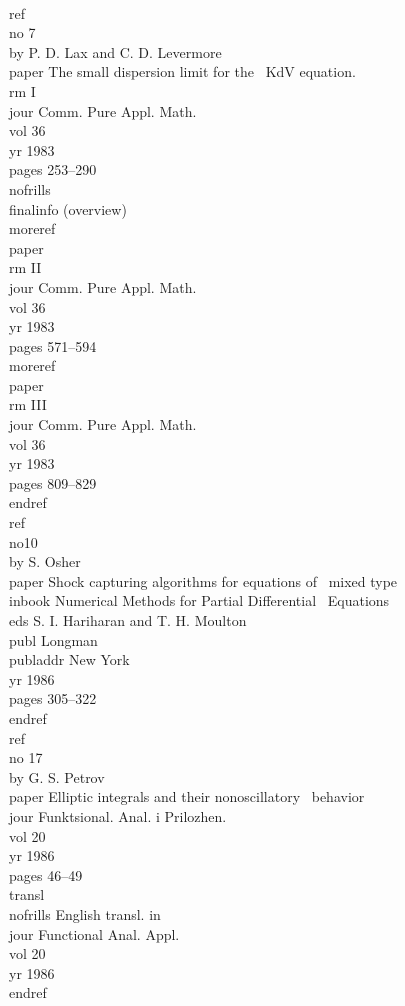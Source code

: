 \beginexample{\exindent=0pt}
\\ref\\no 7
\\by P. D. Lax and C. D. Levermore
\\paper The small dispersion limit for the
\ KdV equation.~{\\rm I}
\\jour Comm. Pure Appl. Math. \\vol 36 \\yr 1983
\\pages 253--290 \\nofrills\\finalinfo (overview)
\\moreref\\paper {\\rm II}
\\jour Comm. Pure Appl. Math. 
\\vol 36 \\yr 1983 \\pages 571--594
\\moreref\\paper {\\rm III}
\\jour Comm. Pure Appl. Math. 
\\vol 36 \\yr 1983 \\pages 809--829 \\endref
\ {}
\\ref\\no10 \\by S. Osher
\\paper Shock capturing algorithms for equations of
\ mixed type
\\inbook Numerical Methods for Partial Differential
\ Equations \\eds S. I. Hariharan and T. H. Moulton
\\publ Longman \\publaddr New York \\yr 1986
\\pages 305--322
\\endref
\ {}
\\ref\\no 17 \\by G. S. Petrov
\\paper Elliptic integrals and their nonoscillatory
\ behavior
\\jour Funktsional. Anal. i Prilozhen.
\\vol 20 \\yr 1986 \\pages 46--49
\\transl\\nofrills English transl. in
\\jour Functional Anal. Appl. \\vol 20\\yr 1986
\\endref
\endexample

